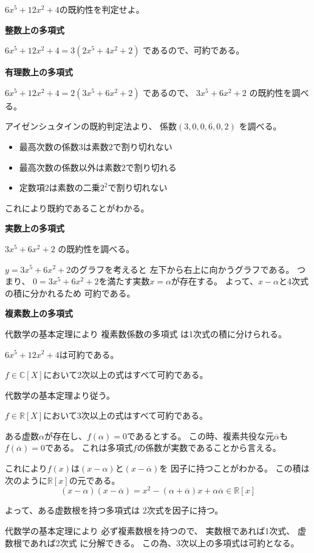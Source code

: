 \documentclass[12pt,b5paper]{ltjsarticle}
\begin{document}
\hrulefill

$6x^5+12x^2+4$の既約性を判定せよ。

\dotfill

\textbf{整数上の多項式}

$6x^5+12x^2+4 = 3(2x^5+4x^2+2)$
であるので、可約である。


\textbf{有理数上の多項式}

$6x^5+12x^2+4 = 2(3x^5+6x^2+2)$
であるので、
$3x^5+6x^2+2$
の既約性を調べる。

アイゼンシュタインの既約判定法より、
係数$(3,0,0,6,0,2)$
を調べる。
\begin{itemize}
 \item 最高次数の係数$3$は素数$2$で割り切れない
 \item 最高次数の係数以外は素数$2$で割り切れる
 \item 定数項$2$は素数の二乗$2^2$で割り切れない
\end{itemize}

これにより既約であることがわかる。

\textbf{実数上の多項式}

$3x^5+6x^2+2$
の既約性を調べる。

$y=3x^5+6x^2+2$のグラフを考えると
左下から右上に向かうグラフである。
つまり、
$0=3x^5+6x^2+2$を満たす実数$x=\alpha$が存在する。
よって、$x-\alpha$と4次式の積に分かれるため
可約である。

\textbf{複素数上の多項式}

代数学の基本定理により
複素数係数の多項式
は1次式の積に分けられる。

$6x^5+12x^2+4$は可約である。

\hrulefill

$f\in\mathbb{C}[X]$において2次以上の式はすべて可約である。

\dotfill

代数学の基本定理より従う。

\hrulefill

$f\in\mathbb{R}[X]$において3次以上の式はすべて可約である。

\dotfill

ある虚数$\alpha$が存在し、$f(\alpha)=0$であるとする。
この時、複素共役な元$\overline{\alpha}$も
$f(\overline{\alpha})=0$である。
これは多項式$f$の係数が実数であることから言える。

これにより$f(x)$は$(x-\alpha)$と$(x-\overline{\alpha})$を
因子に持つことがわかる。
この積は次のように$\mathbb{R}[x]$の元である。
\begin{equation}
 (x-\alpha)(x-\overline{\alpha})
  =x^2-(\alpha+\overline{\alpha})x+\alpha\overline{\alpha}
  \in\mathbb{R}[x]
\end{equation}

よって、ある虚数根を持つ多項式は
2次式を因子に持つ。

代数学の基本定理により
必ず複素数根を持つので、
実数根であれば1次式、
虚数根であれば2次式
に分解できる。
この為、3次以上の多項式は可約となる。

\hrulefill
\end{document}
